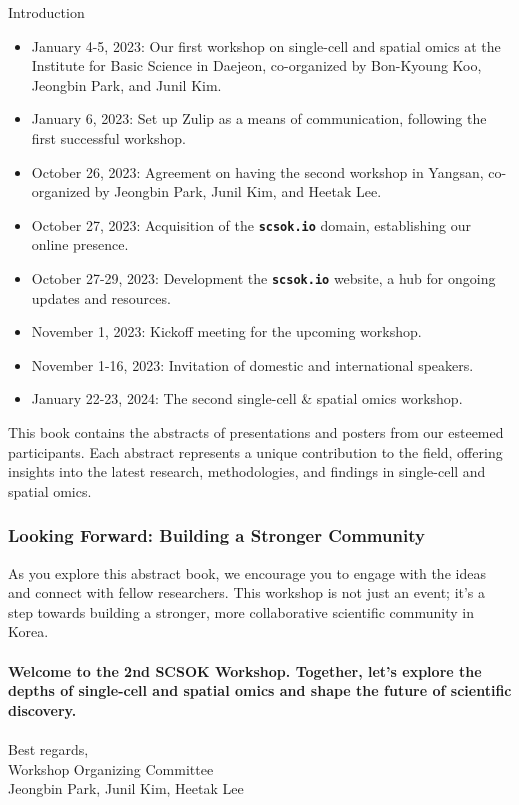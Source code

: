 \begin{coverpage}{Introduction}
{\begin{itemize}[leftmargin=0.5cm, rightmargin=0.5cm]
\item January 4-5, 2023: Our first workshop on single-cell and spatial omics at the Institute for Basic Science in Daejeon, co-organized by Bon-Kyoung Koo, Jeongbin Park, and Junil Kim.
\item January 6, 2023: Set up Zulip as a means of communication, following the first successful workshop.
\item October 26, 2023: Agreement on having the second workshop in Yangsan, co-organized by Jeongbin Park, Junil Kim, and Heetak Lee.
\item October 27, 2023: Acquisition of the \textbf{\texttt{scsok.io}} domain, establishing our online presence.
\item October 27-29, 2023: Development the \textbf{\texttt{scsok.io}} website, a hub for ongoing updates and resources.
\item November 1, 2023: Kickoff meeting for the upcoming workshop.
\item November 1-16, 2023: Invitation of domestic and international speakers.
\item January 22-23, 2024: The second single-cell \& spatial omics workshop.
\end{itemize}

This book contains the abstracts of presentations and posters from our esteemed participants. Each abstract represents a unique contribution to the field, offering insights into the latest research, methodologies, and findings in single-cell and spatial omics.
\\
\subsubsection*{Looking Forward: Building a Stronger Community}
As you explore this abstract book, we encourage you to engage with the ideas and connect with fellow researchers. This workshop is not just an event; it's a step towards building a stronger, more collaborative scientific community in Korea.
\\
\\
\textbf{Welcome to the 2nd SCSOK Workshop. Together, let's explore the depths of single-cell and spatial omics and shape the future of scientific discovery.}
\\
\vspace{1cm}
\\
\noindent
Best regards, \\ Workshop Organizing Committee \\ Jeongbin Park, Junil Kim, Heetak Lee
}
\end{coverpage}